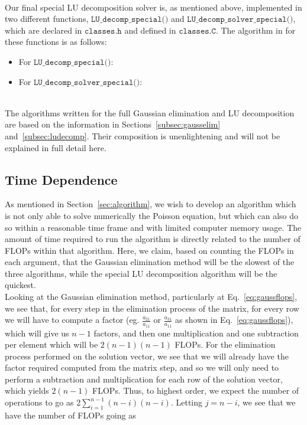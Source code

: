 \documentclass[12pt]{article}
\numberwithin{equation}{section}
\begin{document}
\\\indent Our final special LU decomposition solver is, as mentioned above, implemented in two different functions, $\texttt{LU\_decomp\_special()}$ and $\texttt{LU\_decomp\_solver\_special()}$, which are declared in $\texttt{classes.h}$ and defined in $\texttt{classes.C}$.  The algorithm in for these functions is as follows:

\begin{itemize}
\item For $\texttt{LU\_decomp\_special()}$:
\item For $\texttt{LU\_decomp\_solver\_special()}$:
\end{itemize}

\\\indent The algorithms written for the full Gaussian elimination and LU decomposition are based on the information in Sections~\ref{subsec:gausselim} and~\ref{subsec:ludecomp}.  Their composition is unenlightening and will not be explained in full detail here.

\subsection{Time Dependence}
\label{subsec:timedependence}

As mentioned in Section~\ref{sec:algorithm}, we wish to develop an algorithm which is not only able to solve numerically the Poisson equation, but which can also do so within a reasonable time frame and with limited computer memory usage. The amount of time required to run the algorithm is directly related to the number of FLOPs within that algorithm.  Here, we claim, based on counting the FLOPs in each argument, that the Gaussian elimination method will be the slowest of the three algorithms, while the special LU decomposition algorithm will be the quickest.
\\\indent Looking at the Gaussian elimination method, particularly at Eq.~\ref{eq:gaussflops}, we see that, for every step in the elimination process of the matrix, for every row we will have to compute a factor (eg. $\frac{a_{21}}{a_{11}}$ or $\frac{a_{31}}{a_{11}}$ as shown in Eq.~\ref{eq:gaussflops}), which will give us $n-1$ factors, and then one multiplication and one subtraction per element which will be $2\left(n-1\right)\left(n-1\right)$ FLOPs.  For the elimination process performed on the solution vector, we see that we will already have the factor required computed from the matrix step, and so we will only need to perform a subtraction and multiplication for each row of the solution vector, which yields $2\left(n-1\right)$ FLOPs.  Thus, to highest order, we expect the number of operations to go as $2\sum_{i=1}^{n-1}\left(n-i\right)\left(n-i\right)$.  Letting $j=n-i$, we see that we have the number of FLOPs going as 
\end{document}

